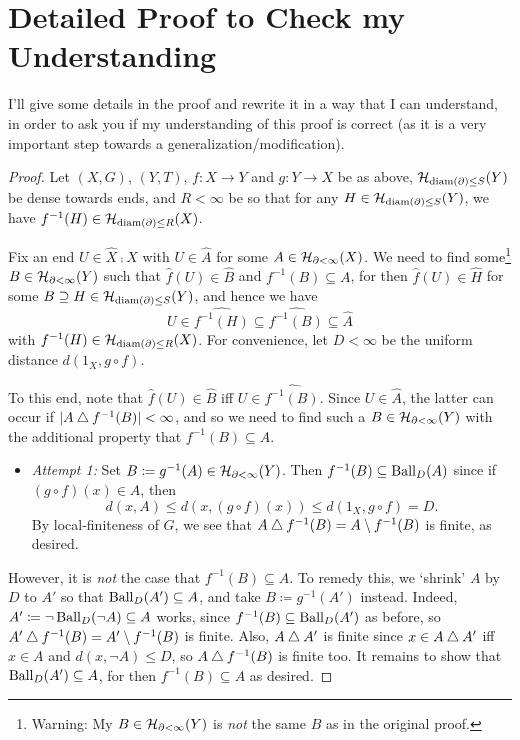 \documentclass{amsart}
\begin{document}
    \setcounter{section}{1}
    \section{Detailed Proof to Check my Understanding}

    I'll give some details in the proof and rewrite it in a way that I can understand, in order to ask you if my understanding of this proof is correct (as it is a very important step towards a generalization/modification).

    \begin{proof}
        Let $(X,G)$, $(Y,T)$, $f:X\to Y$ and $g:Y\to X$ be as above, $\mathcal{H}_{\operatorname{diam}(\partial)\leq S}(Y)$ be dense towards ends, and $R<\infty$ be so that for any $H\in\mathcal{H}_{\operatorname{diam}(\partial)\leq S}(Y)$, we have $f^{-1}(H)\in\mathcal{H}_{\operatorname{diam}(\partial)\leq R}(X)$.

        Fix an end $U\in\widehat{X}\comp X$ with $U\in\widehat{A}$ for some $A\in\mathcal{H}_{\partial<\infty}(X)$. We need to find some\footnote{Warning: My $B\in\mathcal{H}_{\partial<\infty}(Y)$ is \textit{not} the same $B$ as in the original proof.} $B\in\mathcal{H}_{\partial<\infty}(Y)$ such that $\widehat{f}(U)\in\widehat{B}$ and $f^{-1}(B)\subseteq A$, for then $\widehat{f}(U)\in\widehat{H}$ for some $B\supseteq H\in\mathcal{H}_{\operatorname{diam}(\partial)\leq S}(Y)$, and hence we have
        \begin{equation*}
            U\in\widehat{f^{-1}(H)}\subseteq\widehat{f^{-1}(B)}\subseteq\widehat{A}
        \end{equation*}
        with $f^{-1}(H)\in\mathcal{H}_{\operatorname{diam}(\partial)\leq R}(X)$. For convenience, let $D<\infty$ be the uniform distance $d(1_X,g\circ f)$.

        To this end, note that $\widehat{f}(U)\in\widehat{B}$ iff $U\in\widehat{f^{-1}(B)}$. Since $U\in\widehat{A}$, the latter can occur if $|A\bigtriangleup f^{-1}(B)|<\infty$, and so we need to find such a $B\in\mathcal{H}_{\partial<\infty}(Y)$ with the additional property that $f^{-1}(B)\subseteq A$.
        \begin{itemize}
            \item \textit{Attempt 1:} Set $B\coloneqq g^{-1}(A)\in\mathcal{H}_{\partial<\infty}(Y)$. Then $f^{-1}(B)\subseteq\operatorname{Ball}_D(A)$ since if $(g\circ f)(x)\in A$, then
                \begin{equation*}
                    d(x,A)\leq d(x,(g\circ f)(x))\leq d(1_X,g\circ f)=D.
                \end{equation*}
            By local-finiteness of $G$, we see that $A\bigtriangleup f^{-1}(B)=A\setminus f^{-1}(B)$ is finite, as desired.
        \end{itemize}
        However, it is \textit{not} the case that $f^{-1}(B)\subseteq A$. To remedy this, we `shrink' $A$ by $D$ to $A'$ so that $\operatorname{Ball}_D(A')\subseteq A$, and take $B\coloneqq g^{-1}(A')$ instead. Indeed, $A'\coloneqq\lnot\operatorname{Ball}_D(\lnot A)\subseteq A$ works, since $f^{-1}(B)\subseteq\operatorname{Ball}_D(A')$ as before, so $A'\bigtriangleup f^{-1}(B)=A'\setminus f^{-1}(B)$ is finite. Also, $A\bigtriangleup A'$ is finite since $x\in A\bigtriangleup A'$ iff $x\in A$ and $d(x,\lnot A)\leq D$, so $A\bigtriangleup f^{-1}(B)$ is finite too. It remains to show that $\operatorname{Ball}_D(A')\subseteq A$, for then $f^{-1}(B)\subseteq A$ as desired.


\end{proof}
\end{document}
